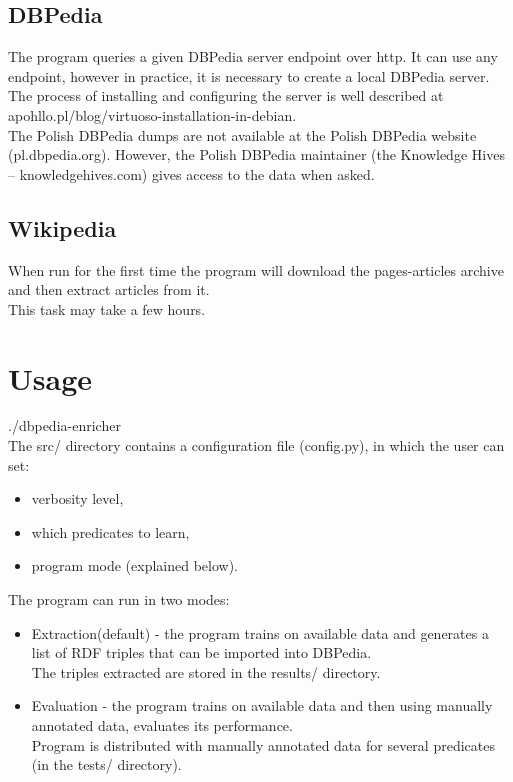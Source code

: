 \documentclass[12pt]{article}
\begin{document}
    \subsection{DBPedia}
    The program queries a given DBPedia server endpoint over http. It can use any endpoint, however in practice, it is necessary to create a local DBPedia server.\\
    The process of installing and configuring the server is well described at apohllo.pl/blog/virtuoso-installation-in-debian.\\
    The Polish DBPedia dumps are not available at the Polish DBPedia website (pl.dbpedia.org). However, the Polish DBPedia maintainer (the Knowledge Hives – knowledgehives.com) gives access to the data when asked.\\
    \subsection{Wikipedia}
    When run for the first time the program will download the pages-articles archive and then extract articles from it.\\
    This task may take a few hours.
    \section{Usage}
    ./dbpedia-enricher\\
    The src/ directory contains a configuration file (config.py), in which the user can set:
    \begin{itemize}
        \item verbosity level,
        \item which predicates to learn,
        \item program mode (explained below).
    \end{itemize}
    The program can run in two modes:
    \begin{itemize}
        \item Extraction(default) - the program trains on available data and generates a list of RDF triples that can be imported into DBPedia.\\ The triples extracted are stored in the results/ directory.
        \item Evaluation - the program trains on available data and then using manually annotated data, evaluates its performance. \\Program is distributed with manually annotated data for several predicates (in the tests/ directory).
    \end{itemize}
\end{document}
